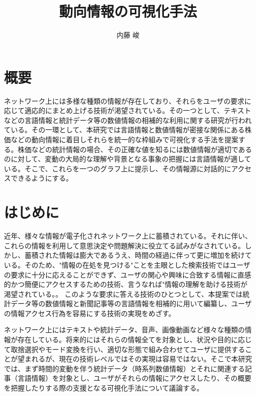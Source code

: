 \documentclass{matsushita-zemi}
\title{動向情報の可視化手法}
\author{内藤 峻}
\begin{document}
\maketitle

\section*{概要}
\label{abstract}
ネットワーク上には多様な種類の情報が存在しており、それらをユーザの要求に応じて適応的にまとめ上げる技術が渇望されている。その一つとして、テキストなどの言語情報と統計データ等の数値情報の相補的な利用に関する研究が行われている。その一環として、本研究では言語情報と数値情報が密接な関係にある株価などの動向情報に着目しそれらを統一的な枠組みで可視化する手法を提案する。株価などの統計情報の場合、その正確な値を知るには数値情報が適切であるのに対して、変動の大局的な理解や背景となる事象の把握には言語情報が適している。そこで、これらを一つのグラフ上に提示し、その情報源に対話的にアクセスできるようにする。\cite{Elucignage}

\section{はじめに}
\label{background}
近年、様々な情報が電子化されネットワーク上に蓄積されている。それに伴い、これらの情報を利用して意思決定や問題解決に役立てる試みがなされている。しかし、蓄積された情報は膨大であるうえ、時間の経過に伴って更に増加を続けている。そのため、"情報の在処を見つける"ことを主眼とした検索技術ではユーザの要求に十分に応えることができず、ユーザの関心や興味に合致する情報に直感的かつ簡便にアクセスするための技術、言うなれば"情報の理解を助ける技術が渇望されている。\cite{information_compilation}\cite{Elucignage-jsai}。
このような要求に答える技術のひとつとして、本提案では統計データ等の数値情報と新聞記事等の言語情報を相補的に用いて編纂し、ユーザの情報アクセス行為を容易にする技術の実現をめざす。

ネットワーク上にはテキストや統計データ、音声、画像動画など様々な種類の情報が存在している。将来的にはそれらの情報全てを対象とし、状況や目的に応じて取捨選択やモード変換を行い、適切な形態で組み合わせてユーザに提供することが望まれるが、現在の技術レベルではその実現は容易ではない。そこで本研究では、まず時間的変動を伴う統計データ（時系列数値情報）とそれに関連する記事（言語情報）を対象とし、ユーザがそれらの情報にアクセスしたり、その概要を把握したりする際の支援となる可視化手法について議論する。
\end{document}
